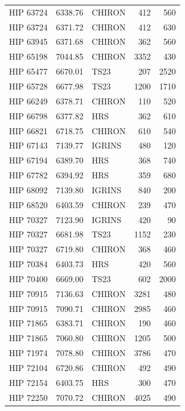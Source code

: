 {\begin{scriptsize}
\begin{longtable}{|l|rlrr|}
   HIP 63724 &  6338.76 &     CHIRON &      412 &   560 \\
   HIP 63724 &  6371.72 &     CHIRON &      412 &   630 \\
   HIP 63945 &  6371.68 &     CHIRON &      362 &   560 \\
   HIP 65198 &  7044.85 &     CHIRON &     3352 &   430 \\
   HIP 65477 &  6670.01 &       TS23 &      207 &  2520 \\
   HIP 65728 &  6677.98 &       TS23 &     1200 &  1710 \\
   HIP 66249 &  6378.71 &     CHIRON &      110 &   520 \\
   HIP 66798 &  6377.82 &        HRS &      362 &   610 \\
   HIP 66821 &  6718.75 &     CHIRON &      610 &   540 \\
   HIP 67143 &  7139.77 &     IGRINS &      480 &   120 \\
   HIP 67194 &  6389.70 &        HRS &      368 &   740 \\
   HIP 67782 &  6394.92 &        HRS &      359 &   680 \\
   HIP 68092 &  7139.80 &     IGRINS &      840 &   200 \\
   HIP 68520 &  6403.59 &     CHIRON &      239 &   470 \\
   HIP 70327 &  7123.90 &     IGRINS &      420 &    90 \\
   HIP 70327 &  6681.98 &       TS23 &     1152 &   230 \\
   HIP 70327 &  6719.80 &     CHIRON &      368 &   460 \\
   HIP 70384 &  6403.73 &        HRS &      420 &   560 \\
   HIP 70400 &  6669.00 &       TS23 &      602 &  2000 \\
   HIP 70915 &  7136.63 &     CHIRON &     3281 &   480 \\
   HIP 70915 &  7090.71 &     CHIRON &     2985 &   460 \\
   HIP 71865 &  6383.71 &     CHIRON &      190 &   460 \\
   HIP 71865 &  7060.80 &     CHIRON &     1205 &   500 \\
   HIP 71974 &  7078.80 &     CHIRON &     3786 &   470 \\
   HIP 72104 &  6720.86 &     CHIRON &      492 &   490 \\
   HIP 72154 &  6403.75 &        HRS &      300 &   470 \\
   HIP 72250 &  7070.72 &     CHIRON &     4025 &   490 \\

\end{longtable}
\end{scriptsize}}
